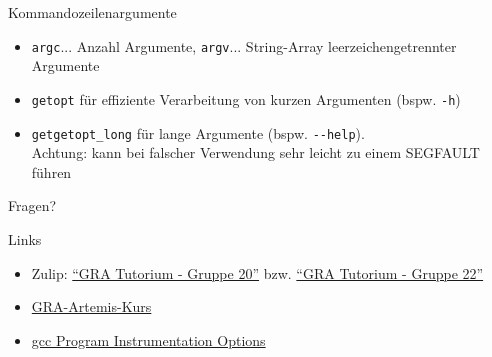\documentclass[
  german,            %
  aspectratio=169,    %
]{tumbeamer}
\begin{document}
\begin{frame}[c, fragile]{Kommandozeilenargumente}{}
  \begin{itemize}
    \item \verb|argc|... Anzahl Argumente, \verb|argv|... String-Array leerzeichengetrennter Argumente
    \item \verb|getopt| für effiziente Verarbeitung von kurzen Argumenten (bspw. \verb|-h|)
    \item \verb|getgetopt_long| für lange Argumente (bspw. \verb|--help|).\\Achtung: kann bei falscher 
    Verwendung sehr leicht zu einem SEGFAULT führen
  \end{itemize}
\end{frame}

\begin{frame}[c]{}{}
  \begin{center}
    \LARGE Fragen?
  \end{center}
\end{frame}

\begin{frame}[fragile, c]{Links}{}
  \begin{itemize}
    \item Zulip: \href{https://zulip.in.tum.de/#narrow/stream/2267-GRA-Tutorium---Gruppe-20}{\enquote{GRA Tutorium - Gruppe 20}}
          bzw. \href{https://zulip.in.tum.de/#narrow/stream/2269-GRA-Tutorium---Gruppe-22}{\enquote{GRA Tutorium - Gruppe 22}}
    \item \href{https://artemis.in.tum.de/courses/329}{GRA-Artemis-Kurs}
    \item \href{https://gcc.gnu.org/onlinedocs/gcc/Instrumentation-Options.html}{gcc Program Instrumentation Options}
  \end{itemize}
\end{frame}

\maketitle
\end{document}
